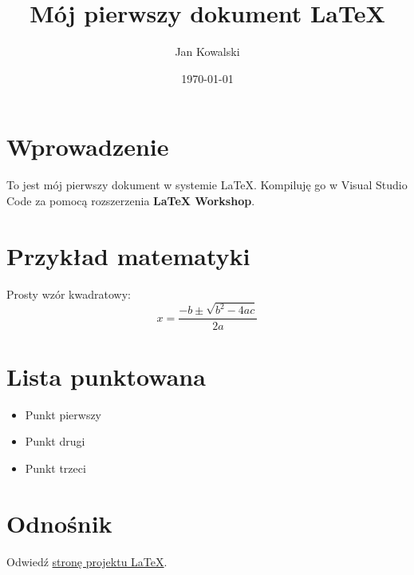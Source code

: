 \documentclass[a4paper,12pt]{article}
\title{Mój pierwszy dokument \LaTeX}
\author{Jan Kowalski}
\date{\today}
\begin{document}
\maketitle

\section{Wprowadzenie}

To jest mój pierwszy dokument w systemie \LaTeX.  
Kompiluję go w Visual Studio Code za pomocą rozszerzenia \textbf{LaTeX Workshop}.

\section{Przykład matematyki}

Prosty wzór kwadratowy:
\[
x = \frac{-b \pm \sqrt{b^2 - 4ac}}{2a}
\]

\section{Lista punktowana}

\begin{itemize}
    \item Punkt pierwszy
    \item Punkt drugi
    \item Punkt trzeci
\end{itemize}

\section{Odnośnik}

Odwiedź \href{https://www.latex-project.org}{stronę projektu \LaTeX}.
\end{document}
